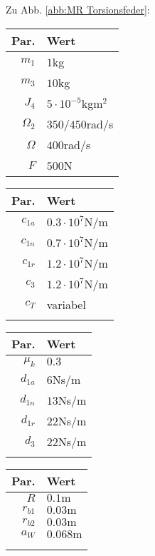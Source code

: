 Zu Abb. \ref{abb:MR Torsionsfeder}:
\begin{center}
\begin{tabular}{r|l}
Par. &Wert\\\hline
$m_1$&$1$kg\\
$m_3$&$10$kg\\
$J_4$& $5\cdot10^{-5}$kgm$^2$ \\
$\Omega_2$&$350$/$450$rad/s\\
$\Omega$&$400$rad/s\\
$F$&$500$N\\
\end{tabular} \hfill
\begin{tabular}{r|l}
Par. &Wert\\\hline
$c_{1a}$&$0.3\cdot10^{7}$N/m\\
$c_{1n}$&$0.7\cdot10^{7}$N/m \\
$c_{1r}$ & $1.2\cdot10^{7}$N/m\\
$c_{3}$ & $1.2\cdot10^{7}$N/m\\
$c_{T}$ & variabel\\
&
\end{tabular} \hfill
\begin{tabular}{r|l}
Par. &Wert\\\hline
$\mu_k$& $0.3$\\
$d_{1a}$&$6$Ns/m\\
$d_{1n}$&$13$Ns/m \\
$d_{1r}$ &$22$Ns/m\\
$d_{3}$ & $22$Ns/m\\
&
\end{tabular} \hfill
\begin{tabular}{r|l}
Par. &Wert\\\hline
$R$&$0.1\textrm{m}$ \\
$r_{b1}$&$ 0.03\textrm{m}$\\
$r_{b2}$&$ 0.03\textrm{m}$\\
$a_{W}$&$ 0.068\textrm{m}$\\
&\\
&
\end{tabular}
\end{center}

